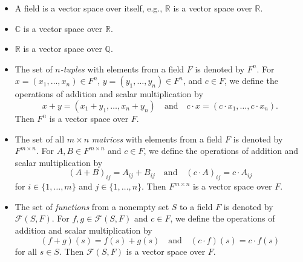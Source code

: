 \begin{examples}
  \leavevmode
  \begin{itemize}
    \item A field is a vector space over itself, e.g., $\mathbb{R}$ is a vector
      space over $\mathbb{R}$.
    \item $\mathbb{C}$ is a vector space over $\mathbb{R}$.
    \item $\mathbb{R}$ is a vector space over $\mathbb{Q}$.
  \end{itemize}
\end{examples}

\begin{examples}
  \leavevmode
  \begin{itemize}
    \item The set of \emph{$n$-tuples} with elements from a field $F$ is
      denoted by $F^n$.
      For $x = (x_1, \dots, x_n) \in F^n$, $y = (y_1, \dots, y_n) \in F^n$, and
      $c \in F$, we define the operations of addition and scalar multiplication
      by
      \begin{equation*}
        x + y = (x_1 + y_1, \dots, x_n + y_n)
        \quad \text{and} \quad
        c \cdot x = (c \cdot x_1, \dots, c \cdot x_n).
      \end{equation*}
      Then $F^n$ is a vector space over $F$.
    \item The set of all $m \times n$ \emph{matrices} with elements from a
      field $F$ is denoted by $F^{m \times n}$.
      For $A, B \in F^{m \times n}$ and $c \in F$, we define the operations of
      addition and scalar multiplication by
      \begin{equation*}
        (A + B)_{ij} = A_{ij} + B_{ij}
        \quad \text{and} \quad
        (c \cdot A)_{ij} = c \cdot A_{ij}
      \end{equation*}
      for $i \in \{1, \dots, m\}$ and $j \in \{1, \dots, n\}$.
      Then $F^{m \times n}$ is a vector space over $F$.
    \item The set of \emph{functions} from a nonempty set $S$ to a field $F$ is
      denoted by $\mathcal{F}(S, F)$.
      For $f, g \in \mathcal{F}(S, F)$ and $c \in F$, we define the operations
      of addition and scalar multiplication by
      \begin{equation*}
        (f + g)(s) = f(s) + g(s)
        \quad \text{and} \quad
        (c \cdot f)(s) = c \cdot f(s)
      \end{equation*}
      for all $s \in S$.
      Then $\mathcal{F}(S, F)$ is a vector space over $F$.

\end{itemize}
\end{examples}
